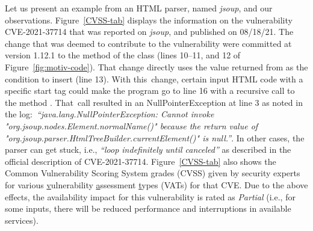 

Let us present an example from an HTML parser, named {\em jsoup}, and
our observations. Figure~\ref{CVSS-tab} displays the information on the
vulnerability CVE-2021-37714 that was reported on {\em jsoup}, and
published on 08/18/21. The change that was deemed to contribute to the
vulnerability were committed at version 1.12.1 to the method
 of the
 class (lines 10--11, and 12 of
Figure~\ref{fig:motiv-code}). That change directly uses the value
returned from  as the condition to
insert  (line 13). With this~change, certain input HTML
code with a specific start tag could make the program go to line 16
with a recursive call to the method . That~call
resulted in an NullPointerException at line 3 as noted in the
log:~{\em ``java.\-lang.\-Null\-Pointer\-Ex\-ception: Cannot invoke
  "org.\-jsoup.\-nodes.\-Element.\-normalName()" because the return
  value of
  "org.\-jsoup.\-parser.\-HtmlTree\-Builder.\-current\-Element()" is
  null.''}. In other cases, the parser can get stuck, i.e., {\em
  ``loop indefinitely until canceled''} as described in the official
description of CVE-2021-37714.
Figure~\ref{CVSS-tab} also shows the Common Vulnerability Scoring
System grades (CVSS) given by security experts for various
\underline{v}ulnerability \underline{a}ssessment \underline{t}ypes
(VATs) for that CVE. Due to the above effects, the availability
impact for this vulnerability is rated as {\em Partial} (i.e., for
some inputs, there will be reduced performance and interruptions in
available services).

